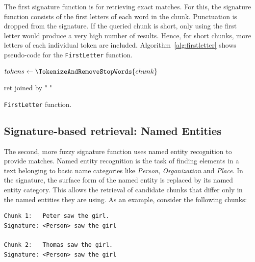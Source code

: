 The first signature function is for retrieving exact matches. For this,
the signature function consists of the first letters of each word in the
chunk. Punctuation is dropped from the signature. If the queried chunk is
short, only using the first letter would produce a very high number of
results. Hence, for short chunks, more letters of each individual token are
included. Algorithm~\ref{alg:firstletter} shows pseudo-code for the {\tt FirstLetter}
function.

\vspace{1em}
\begin{algorithm}[H]
\label{alg:firstletter}


 \SetAlgoLined

 $tokens \leftarrow \TokenizeAndRemoveStopWords{chunk}$

 \Return ret joined by " "
 \caption{{\tt FirstLetter} function.}
\end{algorithm}





\subsection{Signature-based retrieval: Named Entities}

The second, more fuzzy signature function uses named entity recognition
to provide matches. Named entity recognition is the task of finding
elements in a text belonging to basic name categories like
\emph{Person}, \emph{Organization} and \emph{Place}. In the signature,
the surface form of the named entity is replaced by its named entity
category. This allows the retrieval of candidate chunks that differ only
in the named entities they are using. As an example, consider the
following chunks:

\begin{lstlisting}
Chunk 1:   Peter saw the girl.
Signature: <Person> saw the girl

Chunk 2:   Thomas saw the girl.
Signature: <Person> saw the girl
\end{lstlisting}

